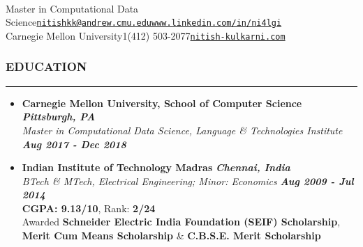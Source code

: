 \documentclass[10pt,a4paper,English]{article}
\newcommand\roottitle[1]{\vspace{-4mm}\subsubsection*{\uppercase{#1}}\vspace{-0.3em}\nopagebreak[4]\hrule\vspace{4mm}}
\newcommand\itemyear[1]{\hfill \textbf{\emph{\color{itemyear} #1}}}
\newcommand\itemenvnoindent{\setlength\itemsep{-1pt} \vspace{-1.5mm}}
\newcommand\hspacing{1mm}
\begin{document}
 \\
\vspace{-2mm}

\small

\noindent Master in Computational Data Science\hfill\href{mailto:nitishkk@andrew.cmu.edu}{\texttt{nitishkk\mbox{}@\mbox{}andrew.cmu.edu}}\hfill\href{https://www.linkedin.com/in/ni4lgi}{\texttt{www.linkedin.com/in/ni4lgi}}\\
\noindent Carnegie Mellon University\hfill\textsmaller{+}1(412) 503-2077\hfill\href{http://www.nitish-kulkarni.com}{\texttt{nitish-kulkarni.com}}\\
\vspace{2mm}

\roottitle{EDUCATION}
    \begin{itemize}[leftmargin=11pt] \itemenvnoindent
    
    \item \textbf{Carnegie Mellon University, School of Computer Science} \itemyear{Pittsburgh, PA}\\[\hspacing]
        \textit{Master in Computational Data Science, Language \& Technologies Institute} \itemyear{Aug 2017 - Dec 2018} \\[\hspacing]

    \vspace{-3mm}

    \item \textbf{Indian Institute of Technology Madras}  \itemyear{Chennai, India}\\[\hspacing]
        \textit{BTech \& MTech, Electrical Engineering; Minor: Economics} \itemyear{Aug 2009 - Jul 2014}\\[\hspacing]
        \textbf{CGPA: 9.13/10}, Rank: \textbf{2/24} \\[\hspacing]
        Awarded \textbf{Schneider Electric India Foundation (SEIF) Scholarship},
        \textbf{Merit Cum Means Scholarship} \& \textbf{C.B.S.E. Merit Scholarship}
    \end{itemize}
\end{document}
